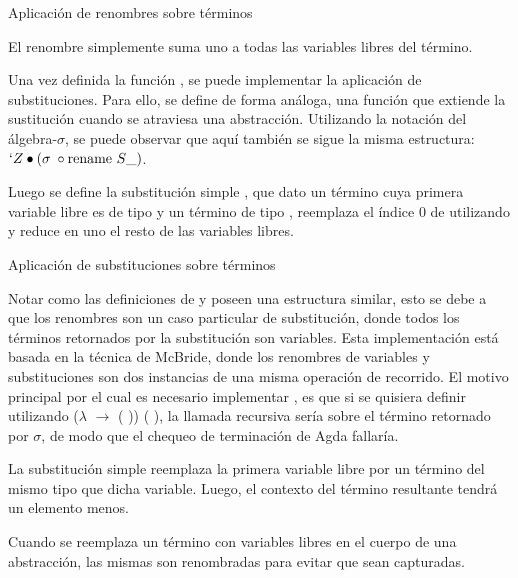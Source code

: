 \begin{codigo}
	Aplicación de renombres sobre términos
\end{codigo}

\begin{example}
	El renombre  simplemente suma uno a todas las variables libres del término.
\end{example}

Una vez definida la función , se puede implementar la aplicación de substituciones.
Para ello, se define de forma análoga, una función  que extiende la sustitución cuando se atraviesa una abstracción.
Utilizando la notación del álgebra-$\sigma$, se puede observar que aquí también se sigue la misma estructura: $`Z \bullet (\sigma \; \circ \text{rename } S\_)$.

Luego se define la substitución simple \func{$\_[\_]$}, que dato un término  cuya primera variable libre es de tipo  y un término  de tipo , reemplaza el índice 0 de  utilizando  y reduce en uno el resto de las variables libres.

\begin{codigo}
	Aplicación de substituciones sobre términos
\end{codigo}

Notar como las definiciones de  y  poseen una estructura similar, esto se debe a que los renombres son un caso particular de substitución, donde todos los términos retornados por la substitución son variables.
Esta implementación está basada en la técnica de McBride\cite{ren-sub}, donde los renombres de variables y substituciones son dos instancias de una misma operación de recorrido.
El motivo principal por el cual es necesario implementar , es que si se quisiera definir  utilizando  ($\lambda$  $\rightarrow$  ( )) (\bound{$\sigma$} ), la llamada recursiva sería sobre el término retornado por $\sigma$, de modo que el chequeo de terminación de Agda fallaría.

\begin{example}
	La substitución simple reemplaza la primera variable libre por un término del mismo tipo que dicha variable.
	Luego, el contexto del término resultante tendrá un elemento menos.
\end{example}
\begin{example}
	Cuando se reemplaza un término con variables libres en el cuerpo de una abstracción, las mismas son renombradas para evitar que sean capturadas.
\end{example}

